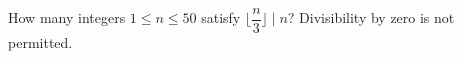 How many integers $1\le n\le 50$ satisfy $\lfloor \dfrac{n}{3}\rfloor\mid n$? Divisibility by zero is not permitted.
